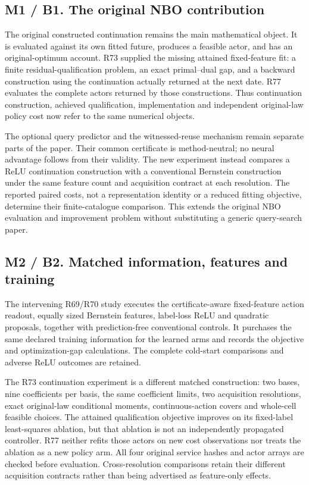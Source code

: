 \hypertarget{m1-b1.-the-original-nbo-contribution}{%
\subsection{M1 / B1. The original NBO
contribution}\label{m1-b1.-the-original-nbo-contribution}}

The original constructed continuation remains the main mathematical
object. It is evaluated against its own fitted future, produces a
feasible actor, and has an original-optimum account. R73 supplied the
missing attained fixed-feature fit: a finite residual-qualification
problem, an exact primal--dual gap, and a backward construction using
the continuation actually returned at the next date. R77 evaluates the
complete actors returned by those constructions. Thus continuation
construction, achieved qualification, implementation and independent
original-law policy cost now refer to the same numerical objects.

The optional query predictor and the witnessed-reuse mechanism remain
separate parts of the paper. Their common certificate is method-neutral;
no neural advantage follows from their validity. The new experiment
instead compares a ReLU continuation construction with a conventional
Bernstein construction under the same feature count and acquisition
contract at each resolution. The reported paired costs, not a
representation identity or a reduced fitting objective, determine their
finite-catalogue comparison. This extends the original NBO evaluation
and improvement problem without substituting a generic query-search
paper.

\hypertarget{m2-b2.-matched-information-features-and-training}{%
\subsection{M2 / B2. Matched information, features and
training}\label{m2-b2.-matched-information-features-and-training}}

The intervening R69/R70 study executes the certificate-aware
fixed-feature action readout, equally sized Bernstein features,
label-loss ReLU and quadratic proposals, together with prediction-free
conventional controls. It purchases the same declared training
information for the learned arms and records the objective and
optimization-gap calculations. The complete cold-start comparisons and
adverse ReLU outcomes are retained.

The R73 continuation experiment is a different matched construction: two
bases, nine coefficients per basis, the same coefficient limits, two
acquisition resolutions, exact original-law conditional moments,
continuous-action covers and whole-cell feasible choices. The attained
qualification objective improves on its fixed-label least-squares
ablation, but that ablation is not an independently propagated
controller. R77 neither refits those actors on new cost observations nor
treats the ablation as a new policy arm. All four original service
hashes and actor arrays are checked before evaluation. Cross-resolution
comparisons retain their different acquisition contracts rather than
being advertised as feature-only effects.

